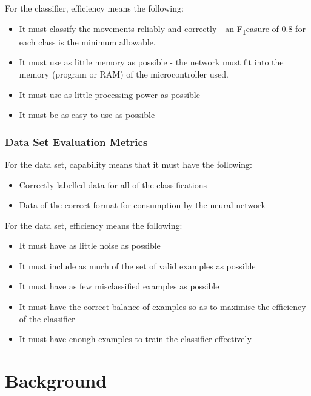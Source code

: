 \documentclass[a4paper]{article}
\begin{document}
For the classifier, efficiency means the following:

\begin{itemize}
\item It must classify the movements reliably and correctly - an F\texorpdfstring{\textsubscript{1}} measure of 0.8 for each class is the minimum allowable.
\item It must use as little memory as possible - the network must fit into the memory (program or RAM) of the microcontroller used.
\item It must use as little processing power as possible
\item It must be as easy to use as possible
\end{itemize}

\subsubsection{Data Set Evaluation Metrics}
\label{subsubsec:in_cs_dsmetrics}

For the data set, capability means that it must have the following:

\begin{itemize}
\item Correctly labelled data for all of the classifications
\item Data of the correct format for consumption by the neural network
\end{itemize}

For the data set, efficiency means the following:

\begin{itemize}
\item It must have as little noise as possible
\item It must include as much of the set of valid examples as possible
\item It must have as few misclassified examples as possible
\item It must have the correct balance of examples so as to maximise the efficiency of the classifier
\item It must have enough examples to train the classifier effectively
\end{itemize}

\newpage
\section{Background}
\label{sec:bg}
\end{document}
